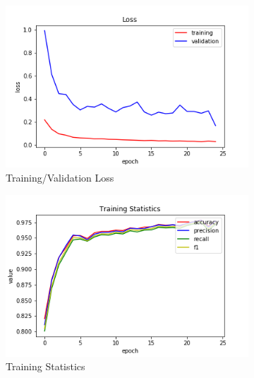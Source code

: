 \begin{figure}[h!]
  \centerfloat
  \begin{subfigure}[b]{0.35\linewidth}
    \includegraphics[width=\linewidth]{images/cae_online_lstm/caelstm_section_lstm_training_block_map_10000_model_loss.png}
     \caption{Training/Validation Loss}
  \end{subfigure}
  \hfill
  \begin{subfigure}[b]{0.35\linewidth}
    \includegraphics[width=\linewidth]{images/cae_online_lstm/caelstm_section_lstm_training_block_map_10000_model_training_stats.png}
     \caption{Training Statistics}
  \end{subfigure}
  \hfill
  \begin{subfigure}[b]{0.35\linewidth}

\end{subfigure}
\end{figure}
